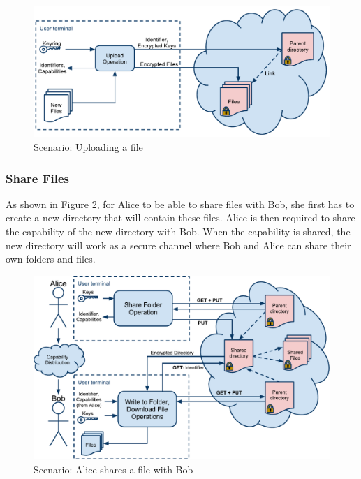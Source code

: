 \documentclass[pdftex,english,10pt,b5paper,twoside]{book}
\begin{document}
\begin{figure}[h!]
    \centering
    \includegraphics[width=\columnwidth]{ArchitectureUpload.pdf}
    \caption{Scenario: Uploading a file}
    \label{fig:AS:upload}
\end{figure}

\subsubsection{Share Files}

As shown in Figure \ref{fig:AS:sharing}, for Alice to be able to share files
with Bob, she first has to create a new directory that will contain these
files. Alice is then required to share the capability of the new directory with
Bob. When the capability is shared, the new directory will work as a secure
channel where Bob and Alice can share their own folders and files.

\begin{figure}[h!]
    \centering
    \includegraphics[width=\columnwidth]{ArchitectureShare.pdf}
    \caption{Scenario: Alice shares a file with Bob}
    \label{fig:AS:sharing}
\end{figure}
\end{document}
